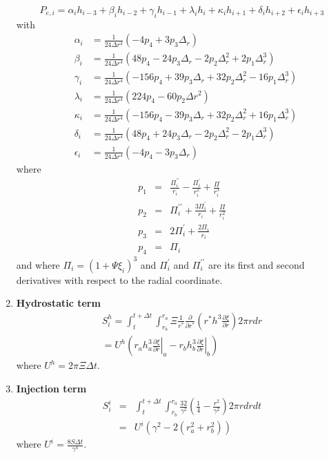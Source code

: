 \begin{article}
\begin{enumerate}
	\begin{equation}
	 \label{num6}
	 P_{e,i}= \alpha_{i}h_{i-3} + \beta_{i}h_{i-2}+\gamma_{i} h_{i-1} +\lambda_{i}h_{i}+\kappa_{i}h_{i+1}+\delta_ih_{i+2}+\epsilon_ih_{i+3}
	\end{equation}
	with
\begin{eqnarray}
	&\alpha_{i}&=\frac{1}{24\Delta r^{4}}\left(-4p_4+3p_3\Delta_r \right)\nonumber \\
	&\beta_{i}&=\frac{1}{24\Delta r^{4}}\left(48p_4-24p_3\Delta_r-2p_2\Delta_r^2+2p_1\Delta_r^3\right) \nonumber\\
	&\gamma_{i}&=\frac{1}{24\Delta r^{4}}\left(-156p_4+39p_3\Delta_r+32p_2\Delta_r^2-16p_1\Delta_r^3\right)\nonumber\\
	&\lambda_{i}&=\frac{1}{24\Delta r^{4}}\left(224p_4-60p_2\Delta r^{2}\right) \nonumber\\
	&\kappa_{i}&=\frac{1}{24\Delta r^{4}}\left( -156p_4-39p_3\Delta_r+32p_2\Delta_r^2+16p_1\Delta_r^3\right)\nonumber\\
	&\delta_{i}&=\frac{1}{24\Delta r^{4}}\left( 48p_4+24p_3\Delta_r-2p_2\Delta_r^2-2p_1\Delta_r^3\right) \nonumber\\
	&\epsilon_{i}&=\frac{1}{24\Delta r^{4}}\left(-4p_4-3p_3\Delta_r \right)\nonumber
\end{eqnarray}
where
	\begin{eqnarray}
	p_1&=&\frac{ \Pi^{\prime\prime}_{i}}{r_i}-\frac{\Pi^{\prime}_{i}}{r_i^2} +\frac{\Pi}{r_i^3}\nonumber\\
	p_2&=&\Pi^{\prime\prime}_{i}+\frac{3\Pi^{\prime}_{i}}{r_i} +\frac{\Pi}{r_i^2}\nonumber\\
	p_3&=&2\Pi^{\prime}_{i}+\frac{2\Pi_i}{r_i}\nonumber\\
	p_4&=&\Pi_i\nonumber
	\end{eqnarray}
and where $ \Pi_{i}=(1+\Psi\xi_i)^{3}$ and $\Pi^{\prime}_{i}$ and $ \Pi^{\prime\prime}_{i}$ are its first and second derivatives with respect to the radial coordinate.
\item \textbf{Hydrostatic term}
 \begin{eqnarray}
 \label{num4}
 S^{h}_{i}= \int_{t}^{t+\Delta t} \int_{r_b}^{r_a} \Xi \frac{1}{r^{*}} \frac{\partial}{\partial r^{*}}\left (r^{*}h^{3}\frac{\partial \xi}{\partial r}\right )2\pi r dr\\
=U^{h}\left ( r_{a}h_{a}^{3} \left. \frac{\partial \xi}{\partial r}\right|_{a}-r_{b}h_{b}^{3}\left. \frac{\partial \xi}{\partial r}\right|_{b} \right )\nonumber
 \end{eqnarray}
 where $U^{h}= 2 \pi \Xi \Delta t$.
\item \textbf{Injection term}
 \begin{eqnarray}
  \label{num5}
 S^{i}_{i}&=&\int_{t}^{t+\Delta t} \int_{r_b}^{r_a} \frac{32}{\gamma^{2}} (\frac{1}{4}-\frac{r^{2}}{\gamma^{2}})  2 \pi r dr dt \\
 &=&U^{i}(\gamma^{2}-2(r_{a}^{2}+r_{b}^{2}))\nonumber
 \end{eqnarray}
 where $U^{i}=\frac{8 S \Delta t}{\gamma^{4}}$. 
 

\end{enumerate}
\end{article}

